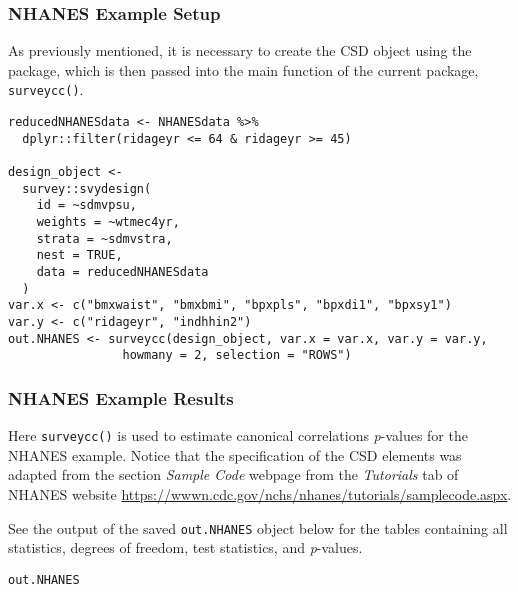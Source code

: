 \hypertarget{nhanes-example-setup}{%
\subsubsection{NHANES Example Setup}\label{nhanes-example-setup}}

As previously mentioned, it is necessary to create the CSD object using the  package, which is then passed into the main function of the current package, \texttt{surveycc()}.

\begin{verbatim}
reducedNHANESdata <- NHANESdata %>% 
  dplyr::filter(ridageyr <= 64 & ridageyr >= 45)

design_object <- 
  survey::svydesign(
    id = ~sdmvpsu,
    weights = ~wtmec4yr,
    strata = ~sdmvstra,
    nest = TRUE,
    data = reducedNHANESdata
  )
var.x <- c("bmxwaist", "bmxbmi", "bpxpls", "bpxdi1", "bpxsy1")
var.y <- c("ridageyr", "indhhin2")
out.NHANES <- surveycc(design_object, var.x = var.x, var.y = var.y,
                howmany = 2, selection = "ROWS")
\end{verbatim}

\hypertarget{nhanes-example-results}{%
\subsubsection{NHANES Example Results}\label{nhanes-example-results}}

Here \texttt{surveycc()} is used to estimate canonical correlations \emph{p}-values for the NHANES example. Notice that the specification of the CSD elements was adapted from the section \emph{Sample Code} webpage from the \emph{Tutorials} tab of NHANES website \url{https://wwwn.cdc.gov/nchs/nhanes/tutorials/samplecode.aspx}.

See the output of the saved \texttt{out.NHANES} object below for the tables containing all statistics, degrees of freedom, test statistics, and \emph{p}-values.

\begin{verbatim}
out.NHANES
\end{verbatim}

